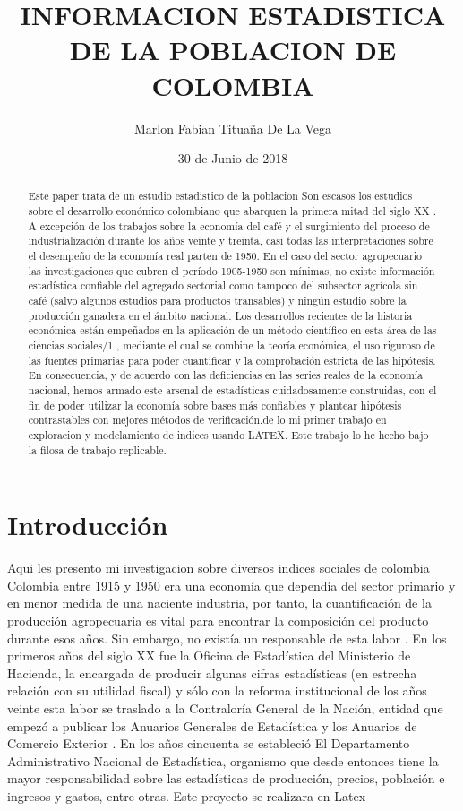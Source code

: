 \documentclass{article}
\title{INFORMACION ESTADISTICA DE LA POBLACION DE COLOMBIA}
\author[1]{\normalsize Marlon Fabian Titua\~na De La Vega}
\affil[1]{\small  Escuela de Ingeniería,Universidad de los Andes\\
\texttt{{mf.tituanad}@uniandes.edu.co}}
\date{30 de Junio de 2018}
\begin{document}

\maketitle
\begin{abstract}
Este  paper trata de un estudio estadistico de la poblacion Son escasos los estudios sobre el desarrollo económico colombiano que abarquen la primera mitad del siglo XX . A excepción de los trabajos sobre la economía del café y el surgimiento del proceso de industrialización durante los años veinte y treinta, casi todas las interpretaciones sobre el desempeño de la economía real parten de 1950. En el caso del sector agropecuario las investigaciones que cubren el
período 1905-1950 son mínimas, no existe información estadística confiable del agregado sectorial como tampoco del subsector agrícola sin café (salvo algunos estudios para productos transables) y ningún estudio sobre la producción ganadera en el ámbito nacional.
Los desarrollos recientes de la historia económica están empeñados en la aplicación de un método científico en esta área de las ciencias sociales/1
, mediante el cual se combine la teoría económica, el uso riguroso de las fuentes primarias para poder cuantificar y la comprobación estricta de las hipótesis. En consecuencia, y de acuerdo con las deficiencias en las series reales de la economía nacional, hemos armado este arsenal de estadísticas cuidadosamente construidas, con el fin de poder utilizar la economía sobre bases más confiables y plantear hipótesis contrastables con mejores métodos de verificación.de lo mi primer trabajo en exploracion y modelamiento de indices usando LATEX. Este trabajo lo he hecho bajo la filosa de trabajo replicable.
\end{abstract}
\section*{Introducción}

Aqui les presento mi investigacion sobre diversos indices sociales  de colombia Colombia entre 1915 y 1950 era una economía que dependía del sector primario y en menor medida de una naciente industria, por tanto, la cuantificación de la producción agropecuaria es vital para encontrar la composición del producto durante esos años. Sin embargo, no existía un responsable de esta labor \cite{macqueen_methods_nodate}. En los primeros años del siglo XX fue la Oficina de Estadística del Ministerio de Hacienda, la encargada de producir algunas cifras estadísticas (en estrecha relación con su utilidad fiscal) y sólo con la reforma institucional de los años veinte esta labor se traslado a la Contraloría General de la Nación, entidad que empezó a publicar los Anuarios Generales de Estadística y los Anuarios de Comercio Exterior \cite{gutierrez_cesar_nodate-1}.  En los años cincuenta se estableció El Departamento Administrativo Nacional de Estadística, organismo que desde entonces tiene la mayor responsabilidad sobre las estadísticas de producción, precios, población e ingresos y gastos, entre otras. Este proyecto se realizara en Latex
\end{document}

